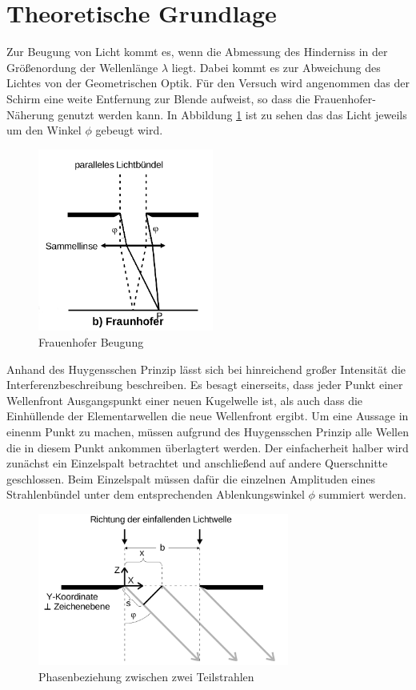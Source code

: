 \section{Theoretische Grundlage}
\label{sec:Theorie}
Zur Beugung von Licht kommt es, wenn die Abmessung des Hinderniss in der Größenordung der Wellenlänge $\lambda$ liegt. Dabei kommt es zur Abweichung des Lichtes von der Geometrischen Optik. Für den Versuch wird angenommen das der Schirm eine weite Entfernung zur  Blende aufweist, so dass die Frauenhofer-Näherung genutzt werden kann. In Abbildung \ref{fig:Fra} ist zu sehen das das Licht jeweils um den Winkel $\phi$ gebeugt wird.
\begin{figure}
  \centering
  \includegraphics[height=6cm]{picture/Frauenhofer.png}
  \caption{Frauenhofer Beugung}
  \label{fig:Fra}
\end{figure}
Anhand des Huygensschen Prinzip lässt sich bei hinreichend großer Intensität die Interferenzbeschreibung beschreiben. Es besagt einerseits, dass jeder Punkt einer Wellenfront Ausgangspunkt einer neuen Kugelwelle ist, als auch dass die Einhüllende der Elementarwellen die neue Wellenfront ergibt. Um eine Aussage in einenm Punkt zu machen, müssen aufgrund des Huygensschen Prinzip alle Wellen die in diesem Punkt ankommen überlagtert werden. Der einfacherheit halber wird zunächst ein Einzelspalt betrachtet und anschließend auf andere Querschnitte geschlossen. Beim Einzelspalt müssen dafür die einzelnen Amplituden eines Strahlenbündel  unter dem entsprechenden Ablenkungswinkel $\phi$ summiert werden.
\begin{figure}
  \centering
  \includegraphics[height=5cm]{picture/doppelspalt.png}
  \caption{Phasenbeziehung zwischen zwei Teilstrahlen}
  \label{fig:dop}
\end{figure}
